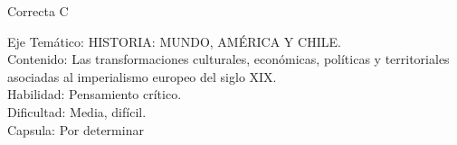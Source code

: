 \documentclass[letterpaper,11pt]{article}
\newcommand{\anchopregunta}{0.9\textwidth}
\begin{document}
\begin{enumerate}
\begin{minipage}{\anchopregunta}
\begin{hint}
\end{hint}
\begin{answer} Correcta C \\
\end{answer}
\begin{info} %
\begin{flushleft}
Eje Temático: HISTORIA: MUNDO, AMÉRICA Y CHILE.\\
Contenido: Las transformaciones culturales, económicas, políticas y territoriales
asociadas al imperialismo europeo del siglo XIX.\\
Habilidad: Pensamiento crítico.\\
Dificultad: Media, difícil.\\
Capsula: Por determinar \\
\end{flushleft} 
\end{info}
\end{minipage}\vfill$\;$ %


\end{enumerate}
\end{document}
